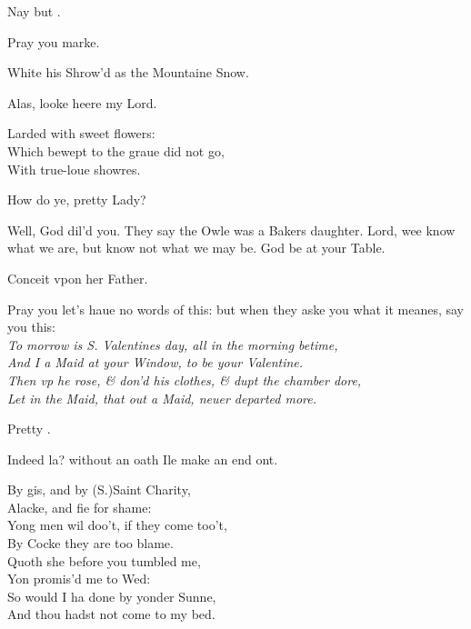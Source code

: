 \documentclass[a5paper,DIV=calc,11pt]{scrbook}
\begin{document}
\begin{drama*}
    
    \queenspeaks Nay but \ophe.
    
    \ophespeaks Pray you marke.\\
    \hspace{2em}\parbox{19em}{White his Shrow'd as the Mountaine Snow.}
    
    \queenspeaks Alas, looke heere my Lord.
    
    \ophespeaks \hspace{2em}\parbox{20em}{Larded with sweet flowers:\\
    Which bewept to the graue did not go,\\
    With true-loue showres.}
    
    \kingspeaks How do ye, pretty Lady?
    
    \ophespeaks Well, God dil'd you. They say the Owle was a Bakers daughter. Lord, wee know what we are, but know not what we may be. God be at your Table.
    
    \kingspeaks Conceit vpon her Father.
    
    \ophespeaks Pray you let's haue no words of this: but when they aske you what it meanes, say you this:\\
    \textit{To morrow is S. Valentines day, all in the morning betime,\\
    And I a Maid at your Window, to be your Valentine.\\
    Then vp he rose, \& don'd his clothes, \& dupt the chamber dore,\\
    Let in the Maid, that out a Maid, neuer departed more.}
    
    \kingspeaks Pretty \ophe.
    
    \ophespeaks Indeed la? without an oath Ile make an end ont.\\
    \hspace{2em}\parbox{20em}{By gis, and by (S.)Saint Charity,\\
    Alacke, and fie for shame:\\
    Yong men wil doo't, if they come too't,\\
    By Cocke they are too blame.\\
    Quoth she before you tumbled me,\\
    Yon promis'd me to Wed:\\
    So would I ha done by yonder Sunne,\\
    And thou hadst not come to my bed.}
    

\end{drama*}
\end{document}
